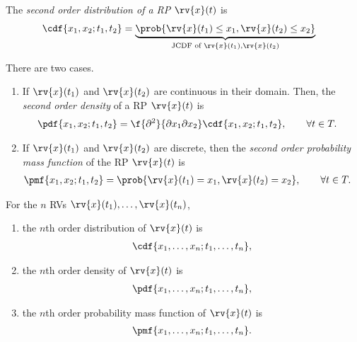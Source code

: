 \begin{definitionBox}
    The \emph{second order distribution of a RP} $\rv{x}(t)$ is
    \begin{align}
        \cdf{x_{1}, x_{2}; t_{1}, t_{2}} &= \underbrace{\prob{\rv{x}(t_{1}) \leq x_{1}, \rv{x}(t_{2})\leq x_{2}}}_{\text{JCDF of } \rv{x}(t_{1}), \rv{x}(t_{2})}
    \end{align}
\end{definitionBox}
\begin{definitionBox}
    There are two cases.
    \begin{enumerate}
        \item If $\rv{x}(t_{1})$ and $\rv{x}(t_{2})$ are continuous in their domain. Then, the \emph{second order density} of a RP $\rv{x}(t)$ is 
        \begin{align}
            \pdf{x_{1}, x_{2}; t_{1}, t_{2}} &= \f{\partial^{2}}{\partial x_{1}\partial x_{2}} \cdf{x_{1}, x_{2}; t_{1}, t_{2}}, \qquad \forall t\in T.
        \end{align}

        \item If $\rv{x}(t_{1})$ and $\rv{x}(t_{2})$ are discrete, then the \emph{second order probability mass function} of the RP $\rv{x}(t)$ is
        \begin{align}
            \pmf{x_{1}, x_{2}; t_{1}, t_{2}} &= \prob{\rv{x}(t_{1}) = x_{1}, \rv{x}(t_{2}) = x_{2}}, \qquad \forall t\in T.
        \end{align}
    \end{enumerate}
\end{definitionBox}

\begin{definitionBox}
    For the $n$ RVs $\rv{x}(t_{1}), \ldots, \rv{x}(t_{n})$, 
    \begin{enumerate}
        \item the $n$th order distribution of $\rv{x}(t)$ is 
        \begin{align}
            \cdf{x_{1},\ldots, x_{n}; t_{1}, \ldots, t_{n}},
        \end{align}
        \item the $n$th order density of $\rv{x}(t)$ is
        \begin{align}
            \pdf{x_{1},\ldots, x_{n}; t_{1}, \ldots, t_{n}},
        \end{align}
        \item the $n$th order probability mass function of $\rv{x}(t)$ is         
        \begin{align}
            \pmf{x_{1}, \ldots, x_{n}; t_{1}, \ldots, t_{n}}.
        \end{align}
    \end{enumerate}
\end{definitionBox}

